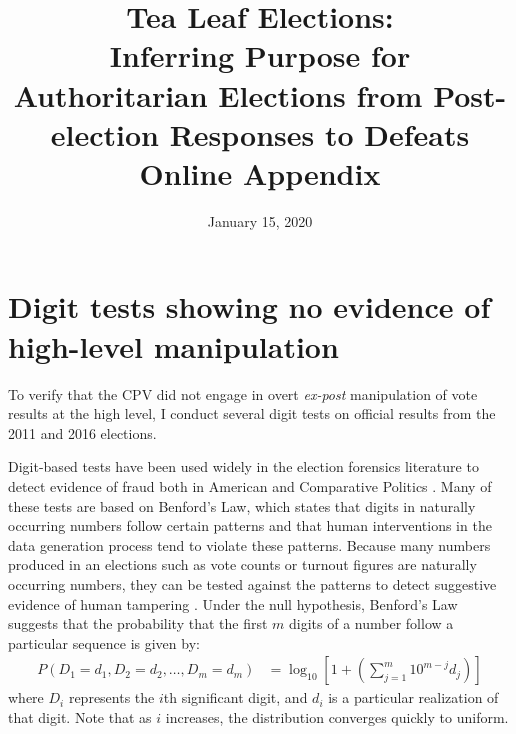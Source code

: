 \documentclass[12pt]{article}
\title{Tea Leaf Elections: \\
	Inferring Purpose for Authoritarian Elections from Post-election Responses to Defeats \\
	\vspace{2ex}
	Online Appendix}
\date{January 15, 2020}
\newcommand{\1}{\mathbbm{1}}
\renewcommand\r{\right}
\renewcommand\l{\left}
\begin{document}
	

\maketitle
\thispagestyle{empty}


\doublespacing

\newpage
{}

\tableofcontents
\newpage

\appendix

\section{Digit tests showing no evidence of high-level manipulation}
\label{app:benford}
To verify that the CPV did not engage in overt \textit{ex-post} manipulation of vote results at the high level, I conduct several digit tests on official results from the 2011 and 2016 elections. 

Digit-based tests have been used widely in the election forensics literature to detect evidence of fraud both in American \citep{Mebane2006} and Comparative Politics \citep{Mebane2009, Beber2012}. Many of these tests are based on Benford's Law, which states that digits in naturally occurring numbers follow certain patterns and that human interventions in the data generation process tend to violate these patterns. Because many numbers produced in an elections such as vote counts or turnout figures are naturally occurring numbers, they can be tested against the patterns to detect suggestive evidence of human tampering \citep{Mebane2006}. Under the null hypothesis, Benford's Law suggests that the probability that the first $m$ digits of a number follow a particular sequence is given by:
\begin{align*}
P(D_1=d_1, D_2=d_2, \dots, D_m=d_m) &= \log_{10}\l[1 + \l( \sum_{j=1}^{m}10^{m-j}d_j\r)\r]
\end{align*}
where $D_i$ represents the $i$th significant digit, and $d_i$ is a particular realization of that digit. 
Note that as $i$ increases, the distribution converges quickly to uniform.
\end{document}
